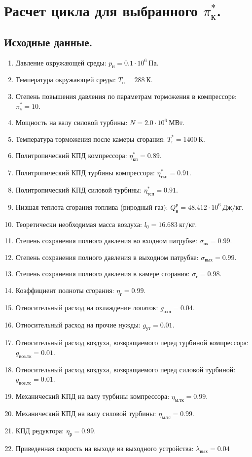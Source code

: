 \documentclass[a4paper,10pt]{article}
\begin{document}
\section{Расчет цикла для выбранного $\pi_к^*$.}

\subsection{Исходные данные.}

\begin{enumerate}

	\item Давление окружающей среды: $p_{н} = 0.1 \cdot 10^6\ Па$.
	\item Температура окружающей среды: $T_{н} = 288\ К$.
	\item Степень повышения давления по параметрам торможения в компрессоре: $\pi_к^*= 10$.
	\item Мощность на валу силовой турбины: $ N = 2.0 \cdot 10^6\ МВт $.
	\item Температура торможения после камеры сгорания: $T_г^* = 1400\ К$.
	\item Политропический КПД компрессора: $\eta^*_{к п} = 0.89 $.
	\item Политропический КПД турбины компрессора: $\eta^*_{ткп} = 0.91$.
	\item Политропический КПД силовой турбины: $\eta^*_{тсп} = 0.91$.
	\item Низшая теплота сгорания топлива (риродный газ): $Q^р_н = 48.412 \cdot 10^6\ Дж/кг$.
	\item Теоретически необходимая масса воздуха: $l_0 = 16.683\ кг/кг$.

	\item Степень сохранения полного давления во входном патрубке: $\sigma_{вх} = 0.99$.
	\item Степень сохранения полного давления в выходном патрубке: $\sigma_{вых} = 0.99$.
	\item Степень сохранения полного давления в камере сгорания: $\sigma_г = 0.98$.
	\item Коэффициент полноты сгорания: $\eta_г = 0.99 $. 
	\item Относительный расход на охлаждение лопаток: $g_{охл} = 0.04$.
	\item Относительный расход на прочие нужды: $g_{ут} = 0.01$.
	\item Относительный расход воздуха, возвращаемого перед турбиной компрессора: $g_{воз.тк} = 0.01$.
	\item Относительный расход воздуха, возвращаемого перед силовой турбиной: $g_{воз.тс} = 0.01$.
	\item Механический КПД на валу турбины компрессора: $\eta_{м.тк} = 0.99$.
	\item Механический КПД на валу силовой турбины: $\eta_{м.тс} = 0.99$.
	\item КПД редуктора: $ \eta_р = 0.99$.
	\item Приведенная скорость на выходе из выходного устройства: $ \lambda_{вых} = 0.04 $

\end{enumerate}
\end{document}
